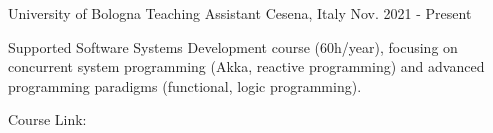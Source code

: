 \begin{cventries}
\cventry
{University of Bologna} %
{Teaching Assistant} %
{Cesena, Italy} %
{Nov. 2021 - Present} %
{
  \begin{cvitems} %
    \item {Supported Software Systems Development course (60h/year), focusing on concurrent system programming (Akka, reactive programming) and advanced programming paradigms (functional, logic programming).}
    \item Course Link: {\href{https://www.unibo.it/en/study/phd-professional-masters-specialisation-schools-and-other-programmes/course-unit-catalogue/course-unit/2021/412598}{\faLink}}
  \end{cvitems}
}

\end{cventries}
